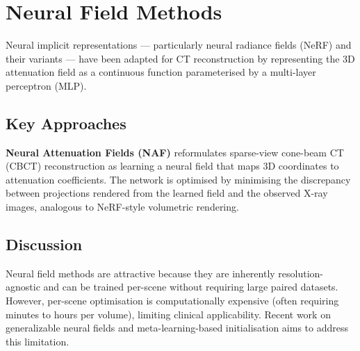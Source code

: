 
\section{Neural Field Methods}
\label{sec:neural_field_methods}

Neural implicit representations — particularly neural radiance fields (NeRF) and their variants — have been adapted for CT reconstruction by representing the 3D attenuation field as a continuous function parameterised by a multi-layer perceptron (MLP).

\subsection{Key Approaches}

\textbf{Neural Attenuation Fields (NAF)} \cite{zha2022naf} reformulates sparse-view cone-beam CT (CBCT) reconstruction as learning a neural field that maps 3D coordinates to attenuation coefficients. The network is optimised by minimising the discrepancy between projections rendered from the learned field and the observed X-ray images, analogous to NeRF-style volumetric rendering.


\subsection{Discussion}

Neural field methods are attractive because they are inherently resolution-agnostic and can be trained per-scene without requiring large paired datasets. However, per-scene optimisation is computationally expensive (often requiring minutes to hours per volume), limiting clinical applicability. Recent work on generalizable neural fields and meta-learning-based initialisation aims to address this limitation.

